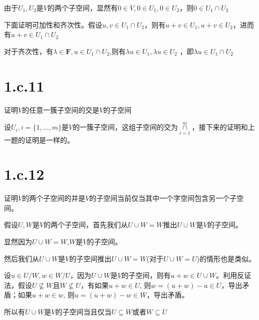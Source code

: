 \documentclass[10pt,a4paper,UTF8]{article}
\begin{document}
\begin{answer}
由于\(U_{1},U_{2}\)是\(V\)的两个子空间，显然有\(0\in V, 0\in U_1 ,0\in U_{2}\)，则\(0\in U_{1}\cap U_{2}\)

下面证明可加性和齐次性。假设\(u,v\in U_{1}\cap U_{2}\)，则有\(u+v\in U_{1},u+v\in U_{2}\)，进而有\(u+v\in U_{1}\cap U_{2}\)

对于齐次性，有\(\lambda \in \mathbf{F},u \in U_{1}\cap U_{2}\),则有\(\lambda u \in U_{1}, \lambda u \in U_{2}\) ，即\(\lambda u\in U_{1}\cap U_{2}\)
\end{answer}
\section*{1.c.11}
\label{sec:org1f99c98}


\begin{problem}
证明\(V\)的任意一簇子空间的交是\(V\)的子空间
\end{problem}

\begin{answer}
设\(U_{i},i=\{1,\ldots ,m\}\)是\(V\)的一簇子空间，这组子空间的交为\(\overset{m}{\underset{i=1}{\cap}}\)，接下来的证明和上一题的证明是一样的。
\end{answer}

\section*{1.c.12}
\label{sec:org546d01c}


\begin{problem}
证明\(V\)的两个子空间的并是\(V\)的子空间当前仅当其中一个字空间包含另一个子空间。
\end{problem}

\begin{answer}
假设\(U,W\)是\(V\)的两个子空间，首先我们从\(U\cup W = W\)推出\(U\cup W\)是\(V\)的子空间。

显然因为\(U\cup W = W\),\(W\)是\(V\)的子空间。


然后我们从\(U\cup W\)是\(V\)的子空间推出\(U\cup W = W\)(对于\(U\cup W = U\))的情形也是类似。

设\(u\in U/W, w\in  W/U\)，因为\(U\cup W\)是\(V\)的子空间，则有\(u+w\in U\cup W\)。利用反证法，假设\(U \nsubseteq W\)且\(W\nsubseteq U\)，有如果\(u+w \in U\), 则\(w = (u+w)-u \in U\)，导出矛盾；如果\(u+w \in w\), 则\(u = (u+w)-w \in W\)，导出矛盾。

所以有\(U\cup W\)是\(V\)的子空间当且仅当\(U\subseteq W\)或者\(W\subseteq U\)
\end{answer}
\end{document}
